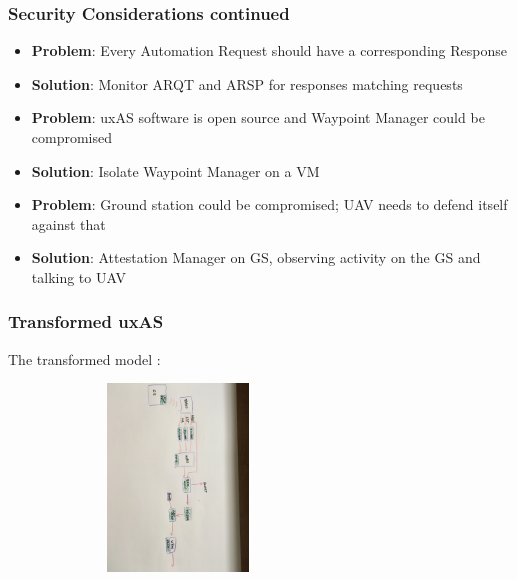 \documentclass{beamer}
\begin{document}
\begin{frame}\frametitle{Security Considerations continued}

\begin{itemize}[<+->]
\item \textbf{Problem}: Every Automation Request should have a corresponding Response
\item \textbf{Solution}: Monitor ARQT and ARSP for responses matching requests

\item \textbf{Problem}: uxAS software is open source and Waypoint Manager could be compromised
\item \textbf{Solution}: Isolate Waypoint Manager on a VM

\item \textbf{Problem}: Ground station could be compromised; UAV needs to defend itself against that
\item \textbf{Solution}: Attestation Manager on GS, observing activity
  on the GS and talking to UAV
\end{itemize}

\end{frame}


\begin{frame}\frametitle{Transformed uxAS}

The transformed model :

\includegraphics[width=90mm,height=50mm]{final-arch.jpg}

\end{frame}
\end{document}
